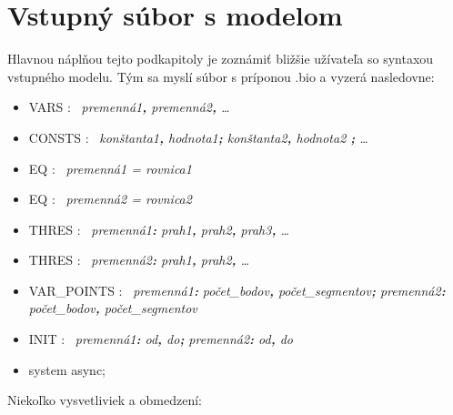 \documentclass[11pt,final,oneside]{fithesis}
\begin{document}
\section{Vstupn\'y s\'ubor s modelom}
Hlavnou n\'apl\v nou tejto podkapitoly je zozn\'ami\v t bli\v z\v sie u\v z\'ivate\v la so syn\-taxou vstupn\'eho modelu. T\'ym sa mysl\'i s\'ubor s pr\'iponou
.bio a vyzer\'a nasledovne:
\begin{itemize}
\item VARS : \ \textit{premenn\'a1{\bf,} premenn\'a2{\bf,} \dots{}}
\item CONSTS : \ \textit{kon\v stanta1{\bf,} hodnota1{\bf;} kon\v stanta2{\bf,} hodnota2 {\bf;} \dots{}}
\item EQ : \ \textit{premenn\'a1 = rovnica1}
\item EQ : \ \textit{premenn\'a2 = rovnica2}
\item THRES : \ \textit{premenn\'a1{\bf:} prah1{\bf,} prah2{\bf,} prah3{\bf,} \dots{}}
\item THRES : \ \textit{premenn\'a2{\bf:} prah1{\bf,} prah2{\bf,} \dots{}}
\item VAR\_POINTS : \ \textit{premenn\'a1{\bf:} po\v cet\_bodov{\bf,} po\v cet\_segmentov{\bf;} premenn\'a2{\bf:} po\v cet\_bodov{\bf,} po\v cet\_segmentov}
\item INIT : \ \textit{premenn\'a1{\bf:} od{\bf,} do{\bf;} premenn\'a2{\bf:} od{\bf,} do}
\item system async;
\end{itemize}
Nieko\v lko vysvetliviek a obmedzen\'i:
\end{document}

